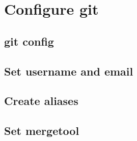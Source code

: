 \section{Configure git}
\begin{frame}[fragile]
    \slidetitle
\end{frame}

\subsection{git config}
\begin{frame}[fragile]
    \subslidetitle
\end{frame}

\subsection{Set username and email}
\begin{frame}[fragile]
    \subslidetitle
\end{frame}

\subsection{Create aliases}
\begin{frame}[fragile]
    \subslidetitle
\end{frame}

\subsection{Set mergetool}
\begin{frame}[fragile]
    \subslidetitle
\end{frame}

